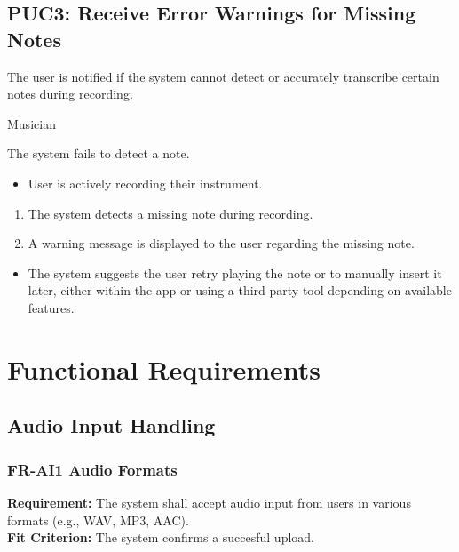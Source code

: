 \documentclass[12pt]{article}
\begin{document}
\subsection*{PUC3: Receive Error Warnings for Missing Notes}
\begin{description}[style=nextline]
    \item[Description:] The user is notified if the system cannot detect or accurately transcribe certain notes during recording.
    \item[Primary Actor:] Musician
    \item[Trigger:] The system fails to detect a note.
    \item[Preconditions:]
    \begin{itemize}
        \item User is actively recording their instrument.
    \end{itemize}
    \item[Main Success Scenario:]
    \begin{enumerate}
        \item The system detects a missing note during recording.
        \item A warning message is displayed to the user regarding the missing note.
    \end{enumerate}
    \item[Exceptions:]
    \begin{itemize}
        \item The system suggests the user retry playing the note or to manually insert it later, either within the app or using a third-party tool depending on available features.
    \end{itemize}
\end{description}


\section{Functional Requirements}
\subsection{Audio Input Handling}
\subsubsection*{FR-AI1 Audio Formats}
\textbf{Requirement:} The system shall accept audio input from users in various formats (e.g., WAV, MP3, AAC). \\
\textbf{Fit Criterion:} The system confirms a succesful upload.
\end{document}
